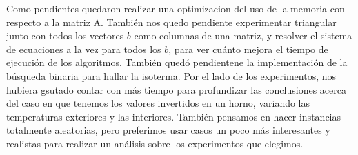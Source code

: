 Como pendientes quedaron realizar una optimizacion del uso de la memoria con respecto a la matriz A. También nos quedo pendiente experimentar triangular junto con todos los vectores $b$ como columnas de una matriz, y resolver el sistema de ecuaciones a la vez para todos los $b$, para ver cuánto mejora el tiempo de ejecución de los algoritmos. También quedó pendientene la implementación de la búsqueda binaria para hallar la isoterma. Por el lado de los experimentos, nos hubiera gsutado contar con más tiempo para profundizar las conclusiones acerca del caso en que tenemos los valores invertidos en un horno, variando las temperaturas exteriores y las interiores. También pensamos en hacer instancias totalmente aleatorias, pero preferimos usar casos un poco más interesantes y realistas para realizar un análisis sobre los experimentos que elegimos.  
